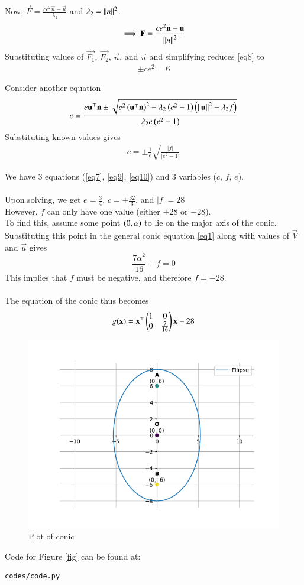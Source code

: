 \documentclass[journal]{IEEEtran}
\begin{document}
Now, $\vec{F}=\frac{ce^2\vec{n}-\vec{u}}{\lambda_2}$ and $\lambda_2=\left\lVert n\right\rVert^2$.
\\
\begin{align}
\implies\mathbf{F}=\frac{ce^2\mathbf{n}-\mathbf{u}}{\left\lVert n\right\rVert^2} \label{eq8}
\end{align}
Substituting values of $\vec{F_1}$, $\vec{F_2}$, $\vec{n}$, and $\vec{u}$ and simplifying reduces \eqref{eq8} to
\begin{align}
\pm ce^2=6 \label{eq9}
\end{align}

Consider another equation $$c=\frac{e\mathbf{u}^\top\mathbf{n}\pm\sqrt{e^2\left(\mathbf{u}^\top\mathbf{n}\right)^2-\lambda_2\left(e^2-1\right)\left(\left\lVert\mathbf{u}\right\rVert^2-\lambda_2f\right)}}{\lambda_2e\left(e^2-1\right)}$$
Substituting known values gives
\begin{align}
c=\pm\frac{1}{e}\sqrt{\frac{|f|}{|e^2-1|}} \label{eq10}
\end{align}

We have 3 equations (\eqref{eq7}, \eqref{eq9}, \eqref{eq10}) and 3 variables ($c$, $f$, $e$).
\\ \\
Upon solving, we get $e=\frac{3}{4}$, $c=\pm\frac{32}{3}$, and $|f|=28$
\\
However, $f$ can only have one value (either $+28$ or $-28$).
\\
To find this, assume some point $\left(0,\alpha\right)$ to lie on the major axis of the conic. Substituting this point in the general conic equation \eqref{eq1} along with values of $\vec{V}$ and $\vec{u}$ gives $$\frac{7\alpha^2}{16}+f=0$$
This implies that $f$ must be negative, and therefore $f=-28$.
\\ \\
The equation of the conic thus becomes $$g(\mathbf{x}) = \mathbf{x}^\top\begin{pmatrix}1&0\\0&\frac{7}{16}\end{pmatrix}\mathbf{x}-28$$

\begin{figure}[h]
	\centering
	\includegraphics[width=\columnwidth]{figs/fig.png}
	\caption{Plot of conic}
	\label{fig}
\end{figure}

Code for Figure \eqref{fig} can be found at:
\begin{lstlisting}
codes/code.py
\end{lstlisting}
\end{document}

